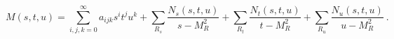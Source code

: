 \begin{equation}
M(s,t,u) = \sum\limits_{i,j,k=0}^{\infty} a_{ijk} s^i t^j u^k +
           \sum\limits_{R_s}^{} \frac{N_s(s,t,u)}{s-M^2_R} +
           \sum\limits_{R_t}^{} \frac{N_t(s,t,u)}{t-M^2_R} +
           \sum\limits_{R_u}^{} \frac{N_u(s,t,u)}{u-M^2_R}\
\label{1.9}.
\end{equation}

